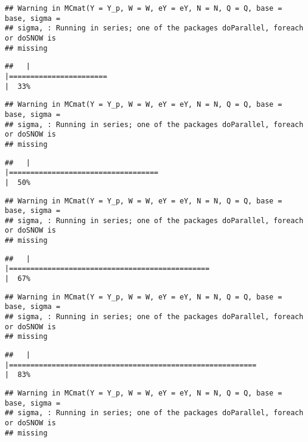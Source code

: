 \documentclass[]{article}
\begin{document}
\begin{verbatim}
## Warning in MCmat(Y = Y_p, W = W, eY = eY, N = N, Q = Q, base = base, sigma =
## sigma, : Running in series; one of the packages doParallel, foreach or doSNOW is
## missing
\end{verbatim}

\begin{verbatim}
##   |                                                                              |=======================                                               |  33%
\end{verbatim}

\begin{verbatim}
## Warning in MCmat(Y = Y_p, W = W, eY = eY, N = N, Q = Q, base = base, sigma =
## sigma, : Running in series; one of the packages doParallel, foreach or doSNOW is
## missing
\end{verbatim}

\begin{verbatim}
##   |                                                                              |===================================                                   |  50%
\end{verbatim}

\begin{verbatim}
## Warning in MCmat(Y = Y_p, W = W, eY = eY, N = N, Q = Q, base = base, sigma =
## sigma, : Running in series; one of the packages doParallel, foreach or doSNOW is
## missing
\end{verbatim}

\begin{verbatim}
##   |                                                                              |===============================================                       |  67%
\end{verbatim}

\begin{verbatim}
## Warning in MCmat(Y = Y_p, W = W, eY = eY, N = N, Q = Q, base = base, sigma =
## sigma, : Running in series; one of the packages doParallel, foreach or doSNOW is
## missing
\end{verbatim}

\begin{verbatim}
##   |                                                                              |==========================================================            |  83%
\end{verbatim}

\begin{verbatim}
## Warning in MCmat(Y = Y_p, W = W, eY = eY, N = N, Q = Q, base = base, sigma =
## sigma, : Running in series; one of the packages doParallel, foreach or doSNOW is
## missing
\end{verbatim}
\end{document}
